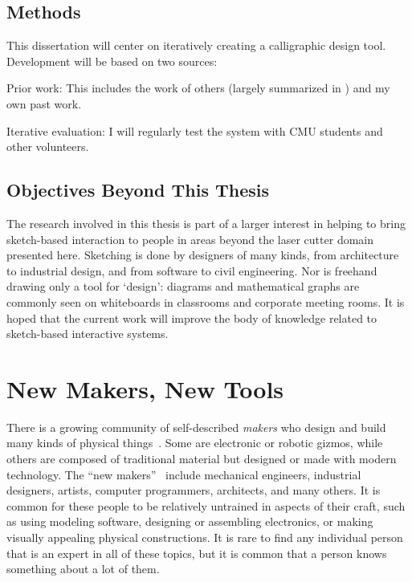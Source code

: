 \documentclass[11pt]{article}
\newenvironment{packed_enum}{
\begin{enumerate}
  \setlength{\itemsep}{1pt}
  \setlength{\parskip}{0pt}
  \setlength{\parsep}{0pt}
}{\end{enumerate}}
\begin{document}
\subsection{Methods}

This dissertation will center on iteratively creating a calligraphic
design tool. Development will be based on two sources:

\begin{packed_enum}
\item Prior work: This includes the work of others (largely summarized
  in \cite{johnson-sketch-review}) and my own past work.
\item Iterative evaluation: I will regularly test the system with CMU
  students and other volunteers. 
\end{packed_enum}

\subsection{Objectives Beyond This Thesis}

The research involved in this thesis is part of a larger interest in
helping to bring sketch-based interaction to people in areas beyond
the laser cutter domain presented here. Sketching is done by designers
of many kinds, from architecture to industrial design, and from
software to civil engineering. Nor is freehand drawing only a tool for
`design': diagrams and mathematical graphs are commonly seen on
whiteboards in classrooms and corporate meeting rooms. It is hoped
that the current work will improve the body of knowledge related to
sketch-based interactive systems.

\section{New Makers, New Tools}

There is a growing community of self-described \textit{makers} who
design and build many kinds of physical
things~\cite{gershenfeld-fab}. Some are electronic or robotic gizmos,
while others are composed of traditional material but designed or made
with modern technology. The ``new makers''~\cite{gross-new-makers}
include mechanical engineers, industrial designers, artists, computer
programmers, architects, and many others. It is common for these
people to be relatively untrained in aspects of their craft, such as
using modeling software, designing or assembling electronics, or
making visually appealing physical constructions. It is rare to find
any individual person that is an expert in all of these topics, but it
is common that a person knows something about a lot of them.
\end{document}
